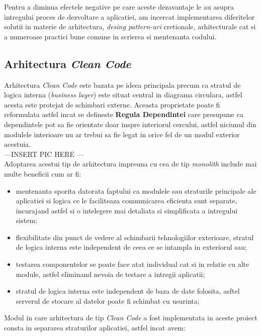 Pentru a diminua efectele negative pe care aceste dezavantaje le au asupra intregului proces de dezvoltare a aplicatiei, am incercat implementarea diferitelor solutii in materie de arhitectura, \textit{desing pattern-uri} cretionale, arhitecturale cat si a numeroase practici bune comune in scrierea si mentenanta codului.

\subsection*{Arhitectura \textit{Clean Code}}
Arhitectura \textit{Clean Code } este bazata pe ideea principala precum ca stratul de logica interna (\textit{business layer}) este situat central in diagrama circulara, astfel acesta este protejat de schimbari externe. Aceasta proprietate poate fi reformulata astfel incat se defineste \textbf{Regula Dependintei} care presupune ca dependintele pot sa fie orientate doar inspre interiorul cercului, astfel niciunul din modulele interioare nu ar trebui sa fie legat in orice fel de un modul exterior acestuia.\\

---INSERT PIC HERE --- \\

Adoptarea acestui tip de arhitectura impreuna cu cea de tip \textit{monolith} include mai multe beneficii cum ar fi:

\begin{itemize}

	\item mentenanta sporita datorata faptului ca modulele sau straturile principale ale aplicatiei si logica ce le faciliteaza comnunicarea eficienta sunt separate, incurajand astfel si o intelegere mai detaliata si simplificata a intregului sistem;
	
	\item flexibilitate din punct de vedere al schimbarii tehnologiilor exterioare, stratul de logica interna este independent de ceea ce se intampla in exteriorul sau;
	
	\item testarea componentelor se poate face atat individual cat si in relatie cu alte module, astfel eliminand nevoia de testare a intregii aplicatii;
	
	\item stratul de logica interna este independent de baza de date folosita, asftel serverul de stocare al datelor poate fi schimbat cu usurinta;

\end{itemize} 
Modul in care arhitectura de tip \textit{Clean Code} a fost implementata in aceste proiect consta in separarea straturilor aplicatiei, astfel incat avem:

